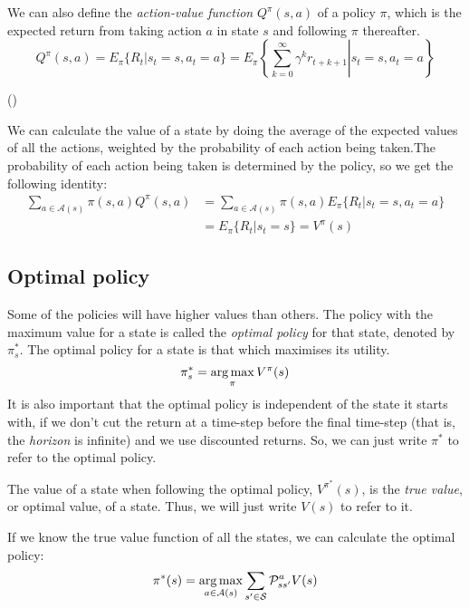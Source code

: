 We can also define the \emph{action-value function} $Q^\pi(s, a)$ of a policy
$\pi$, which is the expected return from taking action $a$ in state $s$ and
following $\pi$ thereafter.
\begin{equation}
  Q^\pi(s, a) = E_\pi \lbrace R_t | s_t = s, a_t = a \rbrace =
  E_\pi \left\{ \left. \sum_{k=0}^\infty \gamma^kr_{t+k+1} \right| s_t = s, a_t = a \right\}
  \label{definition-qvalue}
\end{equation}

(\cite[Section~3.7]{sutton1998introduction})

We can calculate the value of a state by doing the average of the
expected values of all the actions, weighted by the probability of each action
being taken.The probability of each action being taken is determined by the
policy, so we get the following identity:
\begin{equation}
  \begin{split}
  \sum_{a\in\mathcal{A}(s)}\pi(s, a) Q^\pi(s, a) & = \sum_{a\in\mathcal{A}(s)}\pi(s, a) E_\pi \lbrace R_t | s_t = s, a_t = a \rbrace \\
  & = E_\pi \lbrace R_t | s_t = s \rbrace = V^\pi(s)
  \end{split}
  \label{equivalence-qvalue-value}
\end{equation}


\subsection{Optimal policy}

Some of the policies will have higher values than others. The policy with the
maximum value for a state is called the \emph{optimal policy} for that state,
denoted by $\pi^*_s$. The optimal policy for a state is that which maximises its utility.
\begin{equation}
\pi^*_s = \argmax_\pi V^\pi(s)
\end{equation}
It is also important that the optimal policy is independent of the state it
starts with, if we don't cut the return at a time-step before the final
time-step (that is, the \emph{horizon} is infinite) and we use discounted
returns. So, we can just write $\pi^*$ to refer to the optimal policy.

The value of a state when following the optimal policy, $V^{\pi^*}(s)$, is the
\emph{true value}, or optimal value, of a state. Thus, we will just write $V(s)$ to refer to it.

If we know the true value function of all the states, we can calculate the optimal policy:
\begin{equation}
  \pi^*(s) = \argmax_{a\in\mathcal{A}(s)} \sum_{s'\in\mathcal{S}}\mathcal{P}^a_{ss'}V(s)
\end{equation}

